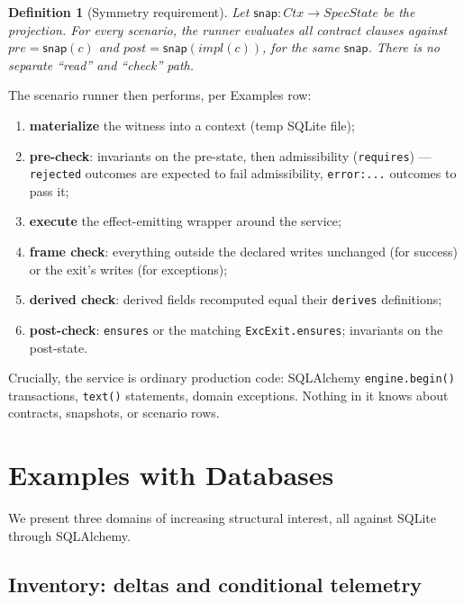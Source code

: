 \documentclass[11pt,a4paper]{article}
\newtheorem{definition}{Definition}
\begin{document}
\begin{definition}[Symmetry requirement]
Let $\mathsf{snap}: \mathit{Ctx} \to \mathit{SpecState}$ be the
projection.  For every scenario, the runner evaluates all contract
clauses against $\mathit{pre} = \mathsf{snap}(c)$ and
$\mathit{post} = \mathsf{snap}(\mathit{impl}(c))$, for the same
$\mathsf{snap}$.  There is no separate ``read'' and ``check'' path.
\end{definition}

The scenario runner then performs, per Examples row:

\begin{enumerate}[label=\arabic*.]
\item \textbf{materialize} the witness into a context (temp SQLite file);
\item \textbf{pre-check}: invariants on the pre-state, then
  admissibility (\texttt{requires}) --- \texttt{rejected} outcomes are
  expected to fail admissibility, \texttt{error:...} outcomes to pass it;
\item \textbf{execute} the effect-emitting wrapper around the service;
\item \textbf{frame check}: everything outside the declared writes
  unchanged (for success) or the exit's writes (for exceptions);
\item \textbf{derived check}: derived fields recomputed equal their
  \texttt{derives} definitions;
\item \textbf{post-check}: \texttt{ensures} or the matching
  \texttt{ExcExit.ensures}; invariants on the post-state.
\end{enumerate}

Crucially, the service is ordinary production code: SQLAlchemy
\texttt{engine.begin()} transactions, \texttt{text()} statements,
domain exceptions.  Nothing in it knows about contracts, snapshots, or
scenario rows.

\section{Examples with Databases}\label{sec:examples}

We present three domains of increasing structural interest, all
against SQLite through SQLAlchemy.

\subsection{Inventory: deltas and conditional telemetry}
\end{document}
